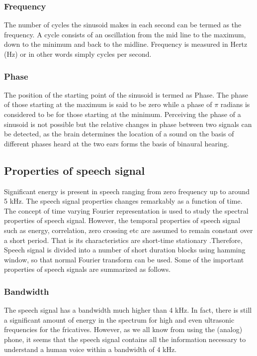 \documentclass[a4paper,12pt]{report} %
\begin{document}
\subsubsection{Frequency}
The number of cycles the sinusoid makes in each second can be termed as the frequency. A cycle consists of an oscillation from the mid line to the maximum, down to the minimum and back to the midline. Frequency is measured in Hertz (Hz) or in other words simply cycles per second. 
\subsubsection{Phase}
The position of the starting point of the sinusoid is termed as Phase. The phase of those starting at the maximum is said to be zero while a phase of $\pi$ radians is considered to be for those starting at the minimum. Perceiving the phase of a sinusoid is not possible but the relative changes in phase between two signals can be detected, as the brain determines the location of a sound on the basis of different phases heard at the two ears forms the basis of binaural hearing.

\subsection{Properties of speech signal }
Significant energy is present in speech ranging from zero frequency up to around 5 kHz. The speech signal properties changes remarkably as a function of time. The concept of time varying Fourier representation is used to study the spectral properties of speech signal. However, the temporal properties of speech signal such as energy, correlation, zero crossing etc are assumed to remain constant over a short period. That is its characteristics are short-time stationary .Therefore, Speech signal is divided into a number of short duration blocks using hamming window, so that normal Fourier transform can be used. Some of the important properties of speech signals are summarized as follows. 
\subsubsection{Bandwidth}
The speech signal has a bandwidth much higher than 4 kHz. In fact, there is still a significant amount of energy in the spectrum for high and even ultrasonic frequencies for the fricatives. However, as we all know from using the (analog) phone, it seems that the speech signal contains all the information necessary to understand a human voice within a bandwidth of 4 kHz. 
\end{document}

